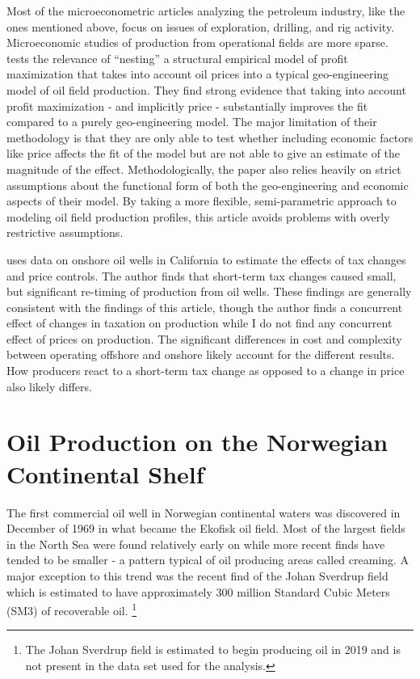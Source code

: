 \documentclass[12pt]{article}
\begin{document}
Most of the microeconometric articles analyzing the petroleum industry, like the ones mentioned above, focus on issues of exploration, drilling, and rig activity. Microeconomic studies of production from operational fields are more sparse. \citet{black_is_1998} tests the relevance of “nesting” a structural empirical model of profit maximization that takes into account oil prices into a typical geo-engineering model of oil field production.  They find strong evidence that taking into account profit maximization - and implicitly price - substantially improves the fit compared to a purely geo-engineering model. The major limitation of their methodology is that they are only able to test whether including economic factors like price affects the fit of the model but are not able to give an estimate of the magnitude of the effect. Methodologically, the paper also relies heavily on strict assumptions about the functional form of both the geo-engineering and economic aspects of their model.  By taking a more flexible, semi-parametric approach to modeling oil field production profiles, this article avoids problems with overly restrictive assumptions. 

\citet{rao_taxation_2010} uses data on onshore oil wells in California to estimate the effects of tax changes and price controls. The author finds that short-term tax changes caused small, but significant re-timing of production from oil wells.  These findings are generally consistent with the findings of this article, though the author finds a concurrent effect of changes in taxation on production while I do not find any concurrent effect of prices on production. The significant differences in cost and complexity between operating offshore and onshore likely account for the different results.  How producers react to a short-term tax change as opposed to a change in price also likely differs.

\section{Oil Production on the Norwegian Continental Shelf}

The first commercial oil well in Norwegian continental waters was discovered in December of 1969 in what became the Ekofisk oil field. Most of the largest fields in the North Sea were found relatively early on while more recent finds have tended to be smaller - a pattern typical of oil producing areas called creaming. A major exception to this trend was the recent find of the Johan Sverdrup field which is estimated to have approximately 300 million Standard Cubic Meters (SM3) of recoverable oil. \footnote{The Johan Sverdrup field is estimated to begin producing oil in 2019 and is not present in the data set used for the analysis.}
\end{document}
